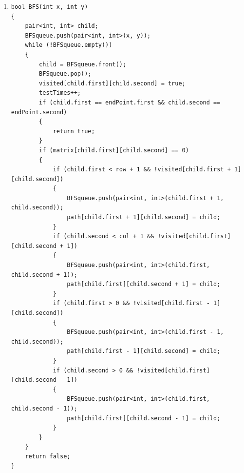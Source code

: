 \documentclass[12pt,a4paper]{article}
\theoremstyle{definition}
\begin{document}
\begin{enumerate}
{\begin{enumerate}
{\begin{lstlisting}
bool DFS()
{
	clear();
	visited[startPoint.first][startPoint.second] = true;
	if (startPoint.first < row + 1)
	{
		if (DFS(startPoint.first + 1, startPoint.second))
		{
		path[startPoint.first][startPoint.second] = pair<int, int>(startPoint.first + 1, startPoint.second);
		return true;
		}
	}
	if (startPoint.second < col + 1)
	{
		if (DFS(startPoint.first, startPoint.second + 1))
		{
			path[startPoint.first][startPoint.second] = pair<int, int>(startPoint.first, startPoint.second + 1);
			return true;
		}
	}
	if (startPoint.first > 0)
	{
		if (DFS(startPoint.first - 1, startPoint.second))
		{
			path[startPoint.first][startPoint.second] = pair<int, int>(startPoint.first - 1, startPoint.second);
			return true;
		}
	}
	if (startPoint.second > 0)
	{
		if (DFS(startPoint.first, startPoint.second - 1))
		{
			path[startPoint.first][startPoint.second] = pair<int, int>(startPoint.first, startPoint.second - 1);
			return true;
		}
	}
	return false;
}
				\end{lstlisting} 
			}
			\item{
\begin{lstlisting}
bool BFS(int x, int y)
{
	pair<int, int> child;
	BFSqueue.push(pair<int, int>(x, y));
	while (!BFSqueue.empty())
	{
		child = BFSqueue.front();
		BFSqueue.pop();
		visited[child.first][child.second] = true;
		testTimes++;
		if (child.first == endPoint.first && child.second == endPoint.second)
		{
			return true;
		}
		if (matrix[child.first][child.second] == 0)
		{
			if (child.first < row + 1 && !visited[child.first + 1][child.second])
			{
				BFSqueue.push(pair<int, int>(child.first + 1, child.second));
				path[child.first + 1][child.second] = child;
			}
			if (child.second < col + 1 && !visited[child.first][child.second + 1])
			{
				BFSqueue.push(pair<int, int>(child.first, child.second + 1));
				path[child.first][child.second + 1] = child;
			}
			if (child.first > 0 && !visited[child.first - 1][child.second])
			{
				BFSqueue.push(pair<int, int>(child.first - 1, child.second));
				path[child.first - 1][child.second] = child;
			}
			if (child.second > 0 && !visited[child.first][child.second - 1])
			{
				BFSqueue.push(pair<int, int>(child.first, child.second - 1));
				path[child.first][child.second - 1] = child;
			}
		}
	}
	return false;
}
				

\end{lstlisting}}
\end{enumerate}}
\end{enumerate}
\end{document}
